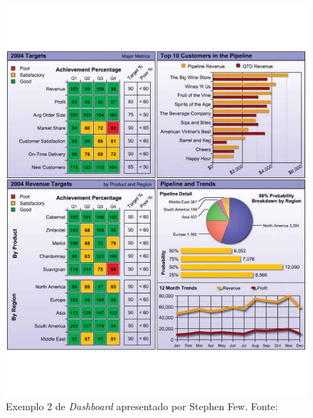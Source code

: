 \graphicspath{{figuras/}}
\begin{figure}[H]
\centering
\includegraphics[scale=0.50]{dashboard2}
\caption{Exemplo 2 de \textit{Dashboard} apresentado por Stephen Few. Fonte: \cite{book_design}}
\label{img:dashboard2}
\end{figure}


